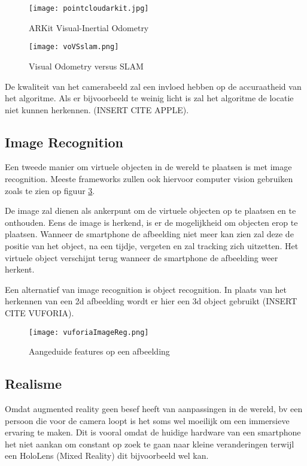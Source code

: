 \begin{figure}
    \texttt{[image: pointcloudarkit.jpg]}
    \caption{ARKit Visual-Inertial Odometry}
    \label{fig:pointcloudarkit}
\end{figure}

\begin{figure}
    \texttt{[image: voVSslam.png]}
    \caption{Visual Odometry versus SLAM \autocite{Yousif2015}}
    \label{fig:voVSslam}
\end{figure}


De kwaliteit van het camerabeeld zal een invloed hebben op de accuraatheid van het algoritme. Als er bijvoorbeeld te weinig licht is zal het algoritme de locatie niet kunnen herkennen. (INSERT CITE APPLE).

\subsection{Image Recognition}
Een tweede manier om virtuele objecten in de wereld te plaatsen is met image recognition. Meeste frameworks zullen ook hiervoor computer vision gebruiken zoals te zien op figuur \ref{fig:imagereg}.

De image zal dienen als ankerpunt om de virtuele objecten op te plaatsen en te onthouden. 
Eens de image is herkend, is er de mogelijkheid om objecten erop te plaatsen. Wanneer de smartphone de afbeelding niet meer kan zien zal deze de positie van het object, na een tijdje, vergeten en zal tracking zich uitzetten. Het virtuele object verschijnt terug wanneer de smartphone de afbeelding weer herkent.

Een alternatief van image recognition is object recognition. In plaats van het herkennen van een 2d afbeelding wordt er hier een 3d object gebruikt (INSERT CITE VUFORIA).

\begin{figure}
    \texttt{[image: vuforiaImageReg.png]}
    \caption{Aangeduide features op een afbeelding}
    \label{fig:imagereg}
\end{figure}

\subsection{Realisme}
Omdat augmented reality geen besef heeft van aanpassingen in de wereld, bv een persoon die voor de camera loopt is het soms wel moeilijk om een immersieve ervaring te maken. Dit is vooral omdat de huidige hardware van een smartphone het niet aankan om constant op zoek te gaan naar kleine veranderingen terwijl een HoloLens (Mixed Reality) dit bijvoorbeeld wel kan.

